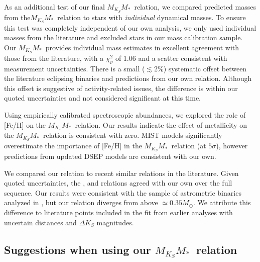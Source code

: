 \documentclass[twocolumn]{aastex62}
\newcommand{\mmk}{$M_{K_S}$\textendash$M_*$}
\begin{document}
As an additional test of our final \mmk\ relation, we compared predicted masses from the\mmk\ relation to stars with {\it individual} dynamical masses. To ensure this test was completely independent of our own analysis, we only used individual masses from the literature and excluded stars in our mass calibration sample. Our \mmk\ provides individual mass estimates in excellent agreement with those from the literature, with a $\chi^2_\nu$ of 1.06 and a scatter consistent with measurement uncertainties. There is a small ($\lesssim$2\%) systematic offset between the literature eclipsing binaries and predictions from our own relation. Although this offset is suggestive of activity-related issues, the difference is within our quoted uncertainties and not considered significant at this time. 

Using empirically calibrated spectroscopic abundances, we explored the role of [Fe/H] on the \mmk\ relation. Our results indicate the effect of metallicity on the \mmk\ relation is consistent with zero. MIST models significantly overestimate the importance of [Fe/H] in the \mmk\ relation (at $5\sigma$), however predictions from updated DSEP models are consistent with our own. 

We compared our relation to recent similar relations in the literature. Given quoted uncertainties, the \citet{Hen1993}, \citet{Delfosse2000} and \citet{Mann2015b} relations agreed with our own over the full sequence. Our results were consistent with the sample of astrometric binaries analyzed in \citet{Benedict2016}, but our relation diverges from \citet{Benedict2016} above $\simeq0.35M_\odot$. We attribute this difference to literature points included in the \citet{Benedict2016} fit from earlier analyses with uncertain distances and $\Delta K_S$ magnitudes.

\subsection{Suggestions when using our \mmk\ relation}\label{sec:caveats}
\end{document}
